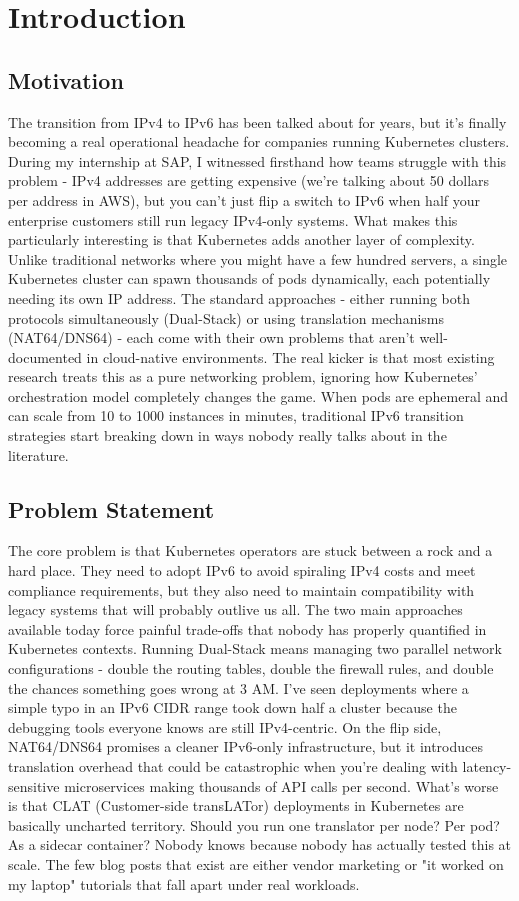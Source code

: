 \chapter{Introduction}
\section{Motivation}
The transition from IPv4 to IPv6 has been talked about for years, but it's finally becoming a real operational headache for companies running Kubernetes clusters. During my internship at SAP, I witnessed firsthand how teams struggle with this problem - IPv4 addresses are getting expensive (we're talking about 50 dollars per address in AWS), but you can't just flip a switch to IPv6 when half your enterprise customers still run legacy IPv4-only systems.
What makes this particularly interesting is that Kubernetes adds another layer of complexity. Unlike traditional networks where you might have a few hundred servers, a single Kubernetes cluster can spawn thousands of pods dynamically, each potentially needing its own IP address. The standard approaches - either running both protocols simultaneously (Dual-Stack) or using translation mechanisms (NAT64/DNS64) - each come with their own problems that aren't well-documented in cloud-native environments.
The real kicker is that most existing research treats this as a pure networking problem, ignoring how Kubernetes' orchestration model completely changes the game. When pods are ephemeral and can scale from 10 to 1000 instances in minutes, traditional IPv6 transition strategies start breaking down in ways nobody really talks about in the literature.


\section{Problem Statement}
The core problem is that Kubernetes operators are stuck between a rock and a hard place. They need to adopt IPv6 to avoid spiraling IPv4 costs and meet compliance requirements, but they also need to maintain compatibility with legacy systems that will probably outlive us all. The two main approaches available today force painful trade-offs that nobody has properly quantified in Kubernetes contexts.
Running Dual-Stack means managing two parallel network configurations - double the routing tables, double the firewall rules, and double the chances something goes wrong at 3 AM. I've seen deployments where a simple typo in an IPv6 CIDR range took down half a cluster because the debugging tools everyone knows are still IPv4-centric. On the flip side, NAT64/DNS64 promises a cleaner IPv6-only infrastructure, but it introduces translation overhead that could be catastrophic when you're dealing with latency-sensitive microservices making thousands of API calls per second.
What's worse is that CLAT (Customer-side transLATor) deployments in Kubernetes are basically uncharted territory. Should you run one translator per node? Per pod? As a sidecar container? Nobody knows because nobody has actually tested this at scale. The few blog posts that exist are either vendor marketing or "it worked on my laptop" tutorials that fall apart under real workloads.


